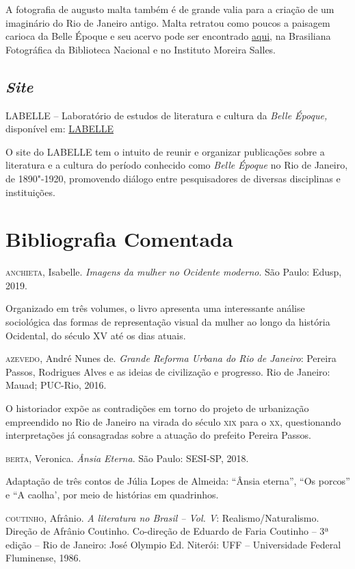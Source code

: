 \documentclass[12pt]{extarticle}
\begin{document}
A fotografia de augusto malta também é de grande valia para a criação de um imaginário 
do Rio de Janeiro antigo. Malta retratou como poucos a paisagem carioca da Belle Époque 
e seu acervo pode ser encontrado \href{http://brasilianafotografica.bn.br/?tag=augusto-malta}{aqui}, na Brasiliana Fotográfica da
Biblioteca Nacional e no Instituto Moreira Salles.

\subsection{\emph{Site}}

LABELLE -- Laboratório de estudos de literatura e cultura da \emph{Belle Époque,} 
disponível em: \href{http://labelleuerj.com.br/}{LABELLE}

O site do LABELLE tem o intuito de reunir e organizar publicações sobre a literatura 
e a cultura do período conhecido como \emph{Belle Époque} no Rio de Janeiro, de 1890"-1920, 
promovendo diálogo entre pesquisadores de diversas disciplinas e instituições.

\section{Bibliografia Comentada}

\textsc{anchieta}, Isabelle. \emph{Imagens da mulher no Ocidente moderno}. São
Paulo: Edusp, 2019. 

Organizado em três volumes, o livro apresenta uma
interessante análise sociológica das formas de representação visual da
mulher ao longo da história Ocidental, do século XV até os dias
atuais.

\textsc{azevedo}, André Nunes de. \emph{Grande Reforma Urbana do Rio de
Janeiro}: Pereira Passos, Rodrigues Alves e as ideias de civilização e
progresso. Rio de Janeiro: Mauad; PUC-Rio, 2016. 

O historiador expõe as contradições em torno do projeto de urbanização empreendido 
no Rio de Janeiro na virada do século \textsc{xix} para o \textsc{xx}, questionando
interpretações já consagradas sobre a atuação do prefeito Pereira
Passos.

\textsc{berta}, Veronica. \textit{Ânsia Eterna}. São Paulo: SESI-SP,
2018.

Adaptação de três contos de Júlia Lopes de Almeida: ``Ânsia eterna'', 
``Os porcos'' e ``A caolha', por meio de histórias em quadrinhos.

\textsc{coutinho}, Afrânio. \textit{A literatura no Brasil -- Vol. V}:
Realismo/Naturalismo. Direção de Afrânio Coutinho. Co-direção de 
Eduardo de Faria Coutinho -- 3ª edição -- Rio de Janeiro: José Olympio
Ed. Niterói: UFF -- Universidade Federal Fluminense, 1986.
\end{document}
